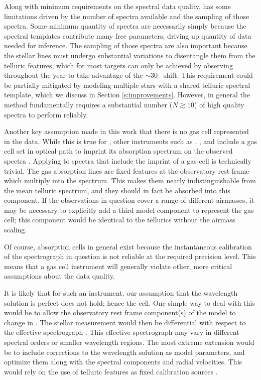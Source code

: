 \documentclass[modern]{aastex62}
\begin{document}
Along with minimum requirements on the spectral data quality, \wobble has some limitations driven by the number of spectra available and the sampling of those spectra. 
Some minimum quantity of spectra are necessarily simply because the spectral templates contribute many free parameters, driving up quantity of data needed for inference. 
The sampling of those spectra are also important because the stellar lines must undergo substantial \RV variations to disentangle them from the telluric features, which for most targets can only be achieved by observing throughout the year to take advantage of the $\sim 30$ \kms~\BERV shift. 
This requirement could be partially mitigated by modeling multiple stars with a shared telluric spectral template, which we discuss in Section \ref{s:improvements}. 
However, in general the \wobble method fundamentally requires a substantial number ($N \gtrsim 10$) of high quality spectra to perform reliably.

Another key assumption made in this work that there is no gas cell represented in the data. 
While this is true for \HARPS, other instruments such as , , and  include a gas cell set in optical path to imprint its absorption spectrum on the observed spectra \citep{Butler1996, Crane2010, Vogt2014}. 
Applying \wobble to spectra that include the imprint of a gas cell is technically trivial. 
The gas absorption lines are fixed features at the observatory rest frame which multiply into the spectrum. 
This makes them nearly indistinguishable from the mean telluric spectrum, and they should in fact be absorbed into this component. 
If the observations in question cover a range of different airmasses, it may be necessary to explicitly add a third model component to represent the gas cell; this component would be identical to the tellurics without the airmass scaling. 

Of course, absorption cells in general exist because the instantaneous calibration of the spectrograph in question is not reliable at the required \RV precision level. 
This means that a gas cell instrument will generally violate other, more critical assumptions about the data quality. 

It is likely that for such an instrument, our assumption that the wavelength solution is perfect does not hold; hence the cell. 
One simple way to deal with this would be to allow the observatory rest frame component(s) of the model to change in \RV. 
The stellar \RV measurement would then be differential with respect to the effective spectrograph \RV. 
This effective spectrograph \RV may vary in different spectral orders or smaller wavelength regions.
The most extreme extension would be to include corrections to the wavelength solution as model parameters, and optimize them along with the spectral components and radial velocities. 
This would rely on the use of telluric features as fixed calibration sources \citep{Seifahrt2010}.
\end{document}
